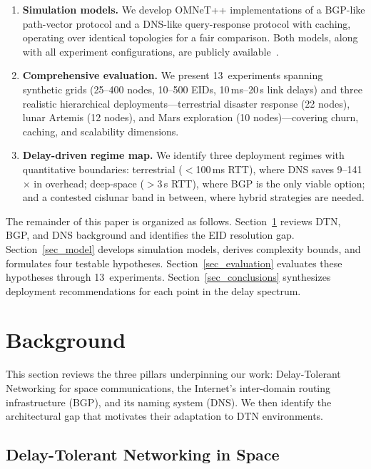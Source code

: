 \documentclass[journal,twocolumn]{IEEEtran}
\begin{document}
\begin{enumerate}
    \item \textbf{Simulation models.} We develop OMNeT++ implementations of a BGP-like path-vector protocol and a DNS-like query-response protocol with caching, operating over identical topologies for a fair comparison. Both models, along with all experiment configurations, are publicly available~\cite{darksol_bgp_dns_omnetpp_2026}.

    \item \textbf{Comprehensive evaluation.} We present 13~experiments spanning synthetic grids (25--400 nodes, 10--500 EIDs, 10\,ms--20\,s link delays) and three realistic hierarchical deployments---terrestrial disaster response (22 nodes), lunar Artemis (12 nodes), and Mars exploration (10 nodes)---covering churn, caching, and scalability dimensions.

    \item \textbf{Delay-driven regime map.} We identify three deployment regimes with quantitative boundaries: terrestrial ($<$100\,ms RTT), where DNS saves 9--141$\times$ in overhead; deep-space ($>$3\,s RTT), where BGP is the only viable option; and a contested cislunar band in between, where hybrid strategies are needed.
\end{enumerate}

The remainder of this paper is organized as follows.
Section~\ref{sec_background} reviews DTN, BGP, and DNS background and identifies the EID resolution gap.
Section~\ref{sec_model} develops simulation models, derives complexity bounds, and formulates four testable hypotheses.
Section~\ref{sec_evaluation} evaluates these hypotheses through 13~experiments.
Section~\ref{sec_conclusions} synthesizes deployment recommendations for each point in the delay spectrum.

\section{Background}
\label{sec_background}

This section reviews the three pillars underpinning our work: Delay-Tolerant Networking for space communications, the Internet's inter-domain routing infrastructure (BGP), and its naming system (DNS). We then identify the architectural gap that motivates their adaptation to DTN environments.

\subsection{Delay-Tolerant Networking in Space}
\label{sec_dtn_space}
\end{document}
